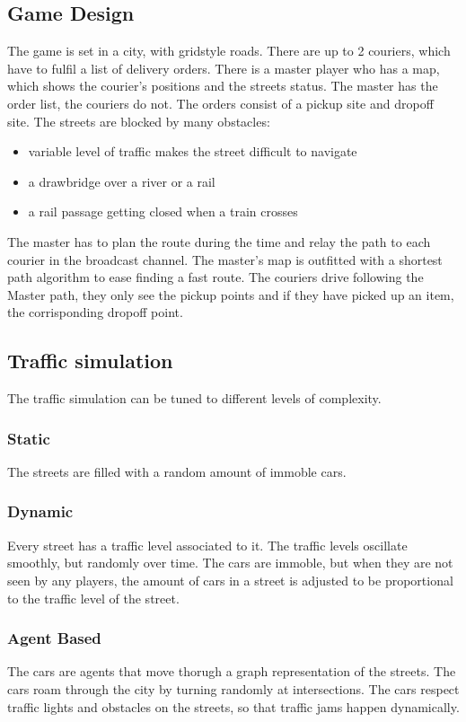 \documentclass{article}
\begin{document}
\subsection{Game Design}
The game is set in a city, with gridstyle roads.
There are up to 2 couriers, which have to fulfil a list of delivery orders.
There is a master player who has a map, which shows the courier's positions and the streets status. The master has the order list, the couriers do not.
The orders consist of a pickup site and dropoff site.
The streets are blocked by many obstacles:
\begin{itemize}
  \item variable level of traffic makes the street difficult to navigate
  \item a drawbridge over a river or a rail
  \item a rail passage getting closed when a train crosses
\end{itemize}
The master has to plan the route during the time and relay the path to each courier in the broadcast channel.
The master's map is outfitted with a shortest path algorithm to ease finding a fast route.
The couriers drive following the Master path, they only see the pickup points and if they have picked up an item, the corrisponding dropoff point.

\subsection{Traffic simulation}
The traffic simulation can be tuned to different levels of complexity.
\subsubsection{Static}
The streets are filled with a random amount of immoble cars.
\subsubsection{Dynamic}
Every street has a traffic level associated to it. The traffic levels oscillate smoothly, but randomly over time. The cars are immoble, but when they are not seen by any players, the amount of cars in a street is adjusted to be proportional to the traffic level of the street.
\subsubsection{Agent Based}
The cars are agents that move thorugh a graph representation of the streets. The cars roam through the city by turning randomly at intersections. The cars respect traffic lights and obstacles on the streets, so that traffic jams happen dynamically.
\end{document}
